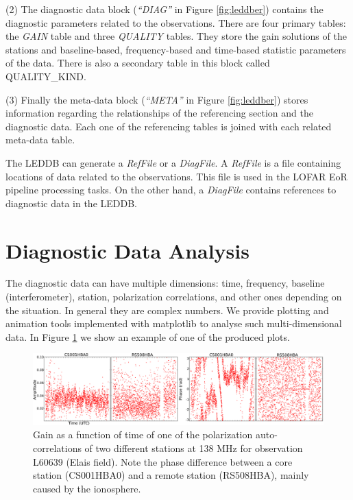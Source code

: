 (2) The diagnostic data block (\textit{``DIAG''} in Figure \ref{fig:leddber}) contains the diagnostic parameters related to the observations. There are four primary tables: the \textit{GAIN} table and three \textit{QUALITY} tables. They store the gain solutions of the stations and baseline-based, frequency-based and time-based statistic parameters of the data. There is also a secondary table in this block called QUA\-LI\-TY\-\_KIND.

(3) Finally the meta-data block (\textit{``META''} in Figure \ref{fig:leddber}) stores information regarding the relationships of the referencing section and the diagnostic data. Each one of the referencing tables is joined with each related meta-data table.

The LEDDB can generate a \textit{RefFile} or a \textit{DiagFile}. A \textit{RefFile} is a file containing locations of data related to the observations. This file is used in the LOFAR EoR pipeline processing tasks. On the other hand, a \textit{DiagFile} contains references to diagnostic data in the LEDDB.

\section{Diagnostic Data Analysis}
The diagnostic data can have multiple dimensions: time, frequency, baseline (interferometer), station, polarization correlations, and other ones depending on the situation. In general they are complex numbers. We provide plotting and animation tools implemented with matplotlib to analyse such multi-dimensional data. In Figure \ref{fig:gain} we show an example of one of the produced plots.
\begin{figure}[!ht]
  \centering
    \includegraphics[scale=0.19]{part10/Martinez-rubi_O23/O23_f2.eps} 
  \caption{Gain as a function of time of one of the polarization auto-correlations of two different stations at 138 MHz for observation L60639 (Elais field). Note the phase difference between a core station (CS001HBA0) and a remote station (RS508HBA), mainly caused by the ionosphere.}
  \label{fig:gain}
\end{figure}

